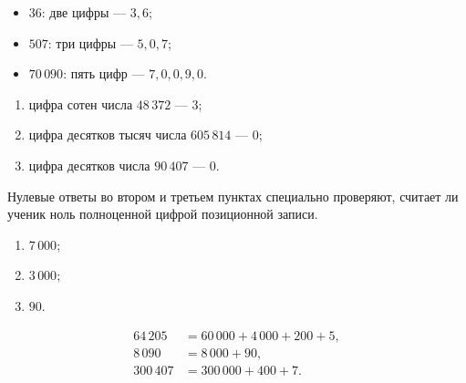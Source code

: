 
\clearpage
{}

\begin{teacheranswer}[Задание 1]
  \begin{itemize}
    \item \(36\): две цифры --- \(3,6\);
    \item \(507\): три цифры --- \(5,0,7\);
    \item \(70\,090\): пять цифр --- \(7,0,0,9,0\).
  \end{itemize}
\end{teacheranswer}

\begin{teacheranswer}[Задание 2]
  \begin{enumerate}
    \item цифра сотен числа \(48\,372\) --- \(3\);
    \item цифра десятков тысяч числа \(605\,814\) --- \(0\);
    \item цифра десятков числа \(90\,407\) --- \(0\).
  \end{enumerate}
\end{teacheranswer}

\begin{criterionbox}
  Нулевые ответы во втором и третьем пунктах специально проверяют, считает
  ли ученик ноль полноценной цифрой позиционной записи.
\end{criterionbox}

\begin{teacheranswer}[Задание 3]
  \begin{enumerate}
    \item \(7\,000\);
    \item \(3\,000\);
    \item \(90\).
  \end{enumerate}
\end{teacheranswer}

\begin{teacheranswer}[Задание 4]
  \begin{align*}
    64\,205&=60\,000+4\,000+200+5,\\
    8\,090&=8\,000+90,\\
    300\,407&=300\,000+400+7.
  \end{align*}
\end{teacheranswer}


